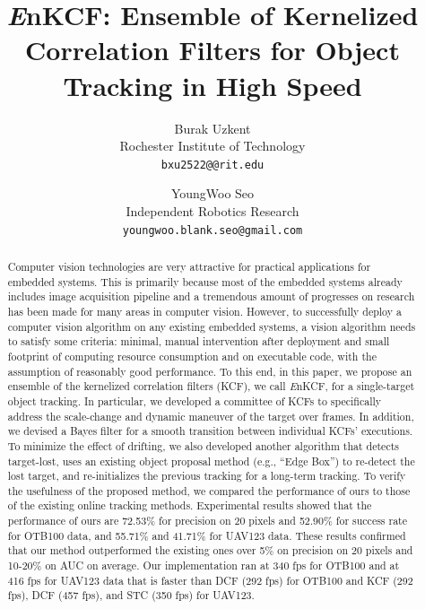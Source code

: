 \documentclass[10pt,twocolumn,letterpaper]{article}
\newcounter{ct}
\begin{document}
\title{ {\it E}nKCF: Ensemble of Kernelized Correlation Filters for Object Tracking in High Speed}

\author{Burak Uzkent\\
Rochester Institute of Technology\\
{\tt\small bxu2522@@rit.edu}
\and
YoungWoo Seo\\
Independent Robotics Research\\
{\tt\small youngwoo.blank.seo@gmail.com}
}

\maketitle

\begin{abstract}
Computer vision technologies are very attractive for practical
applications for embedded systems. This is primarily because most of
the embedded systems already includes image acquisition pipeline and a
tremendous amount of progresses on research has been made for many
areas in computer vision. However, to successfully deploy a computer
vision algorithm on any existing embedded systems, a vision algorithm
needs to satisfy some criteria: minimal, manual intervention after
deployment and small footprint of computing resource consumption and
on executable code, with the assumption of reasonably good
performance. To this end, in this paper, we propose an ensemble of the
kernelized correlation filters (KCF), we call {\it E}nKCF, for a
single-target object tracking. In particular, we developed a committee
of KCFs to specifically address the scale-change and dynamic maneuver
of the target over frames. In addition, we devised a Bayes filter for
a smooth transition between individual KCFs' executions. To minimize
the effect of drifting, we also developed another algorithm that
detects target-lost, uses an existing object proposal method (e.g.,
``Edge Box'') to re-detect the lost target, and re-initializes the
previous tracking for a long-term tracking. To verify the usefulness
of the proposed method, we compared the performance of ours to those
of the existing online tracking methods. Experimental results showed
that the performance of ours are 72.53\% for precision on 20 pixels
and 52.90\% for success rate for OTB100 data, and 55.71\% and 41.71\%
for UAV123 data. These results confirmed that our method outperformed
the existing ones over 5\% on precision on 20 pixels and 10-20\% on
AUC on average. Our implementation ran at 340 fps for OTB100 and at
416 fps for UAV123 data that is faster than DCF (292 fps) for OTB100
and KCF (292 fps), DCF (457 fps), and STC (350 fps) for UAV123.
\end{abstract}
\end{document}
